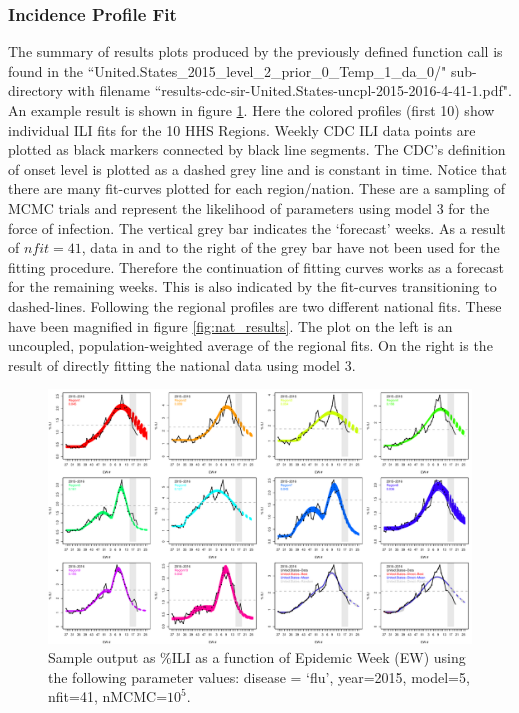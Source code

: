 \documentclass[a4paper]{article}
\begin{document}
\subsubsection{Incidence Profile Fit}
\label{sec:resultsGraphics}
The summary of results plots produced by the previously defined function call is found in the ``United.States\_2015\_level\_2\_prior\_0\_Temp\_1\_da\_0/" sub-directory with filename ``results-cdc-sir-United.States-uncpl-2015-2016-4-41-1.pdf".  An example result is shown in figure \ref{fig:results}.  Here the colored profiles (first 10) show individual ILI fits for the 10 HHS Regions.  Weekly CDC ILI data points are plotted as black markers connected by black line segments.  The CDC's definition of onset level is plotted as a dashed grey line and is constant in time.  Notice that there are many fit-curves plotted for each region/nation.  These are a sampling of MCMC trials and represent the likelihood of parameters using model 3 for the force of infection.   The vertical grey bar indicates the `forecast' weeks.  As a result of $nfit=41$, data in and to the right of the grey bar have not been used for the fitting procedure.  Therefore the continuation of fitting curves works as a forecast for the remaining weeks.  This is also indicated by the fit-curves transitioning to dashed-lines.  Following the regional profiles are two different national fits.  These have been magnified in figure \ref{fig:nat_results}.  The plot on the left is an uncoupled, population-weighted average of the regional fits. On the right is the result of directly fitting the national data using model 3.
\begin{figure}[htbp]
  \centering
  \includegraphics[width=\linewidth]{figures/results-cdc-2015-2016-5-41-1.pdf}
  \caption{Sample  output as \%ILI as a function of Epidemic Week (EW) using the following parameter values: disease = `flu', year=2015,  model=5, nfit=41, nMCMC=$10^5$. }
  \label{fig:results}
\end{figure}
\end{document}
